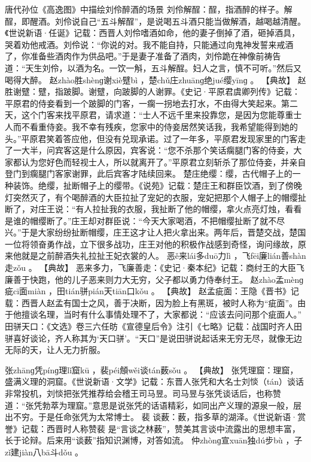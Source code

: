 \documentclass[12pt,UTF8]{ctexbook}
\begin{document}
唐代孙位《高逸图》中描绘刘伶醉酒的场景
刘伶解酲：酲，指酒醉的样子。解酲，即醒酒。刘伶说自己“五斗解酲”，是说喝五斗酒只能当做解酒，越喝越清醒。《世说新语·任诞》记载：西晋人刘伶嗜酒如命，他的妻子倒掉了酒，砸掉酒具，哭着劝他戒酒。刘伶说：“你说的对。我不能自持，只能通过向鬼神发誓来戒酒了，你准备些酒肉作为供品吧。”于是妻子准备了酒肉，刘伶跪在神像前祷告道：“天生刘伶，以酒为名。一饮一斛，五斗解酲。妇人之言，慎不可听。”然后又喝得大醉。
赵zhào胜shènɡ谢xiè躄bì
，楚chǔ庄zhuānɡ绝jué缨yīnɡ
。
【典故】
赵胜谢躄：躄，指跛脚。谢躄，向跛脚的人谢罪。《史记·平原君虞卿列传》记载：平原君的侍妾看到一个跛脚的门客，一瘸一拐地去打水，不由得大笑起来。第二天，这个门客来找平原君，请求道：“士人不远千里来投靠您，是因为您能尊重士人而不看重侍妾。我不幸有残疾，您家中的侍妾居然笑话我，我希望能得到她的头。”平原君笑着答应他，但没有兑现承诺。过了一年多，平原君发现家里的门客走了一大半，问宾客这是什么原因，宾客说：“您不杀那个笑话瘸腿门客的侍妾，大家都认为您好色而轻视士人，所以就离开了。”平原君立刻斩杀了那位侍妾，并亲自登门到瘸腿门客家谢罪，此后宾客才陆续回来。
楚庄绝缨：缨，古代帽子上的一种装饰。绝缨，扯断帽子上的缨带。《说苑》记载：楚庄王和群臣饮酒，到了傍晚灯突然灭了，有个喝醉酒的大臣拉扯了宠妃的衣服，宠妃把那个人帽子上的帽缨扯断了，对庄王说：“有人拉扯我的衣服，我扯断了他的帽缨，拿火点亮灯烛，看看是谁的帽缨断了。”庄王却对群臣说：“今天大家喝酒，不把帽缨扯断了就不尽兴。”于是大家纷纷扯断帽缨，庄王这才让人把火拿出来。两年后，晋楚交战，楚国一位将领奋勇作战，立下很多战功，庄王对他的积极作战感到奇怪，询问缘故，原来他就是之前醉酒失礼拉扯王妃衣裳的人。
恶ě来lái多duō力lì
，飞fēi廉lián善shàn走zǒu
。
【典故】
恶来多力，飞廉善走：《史记·秦本纪》记载：商纣王的大臣飞廉善于快跑，他的儿子恶来则力大无穷，父子都以勇力侍奉纣王。
赵zhào孟mènɡ疵cī面miàn
，田tián骈pián天tiān口kǒu
。
【典故】
赵孟疵面：王隐《晋书》记载：西晋人赵孟有国士之风，善于决断，因为脸上有黑斑，被时人称为“疵面”。由于他擅谈名理，当时有什么事情处理不了，大家都说：“应该去问问那个疵面人。”
田骈天口：《文选》卷三六任昉《宣德皇后令》注引《七略》记载：战国时齐人田骈喜好谈论，齐人称其为‘天口骈’。“天口”是说田骈说起话来无穷无尽，就像无边无际的天，让人无力折服。

张zhānɡ凭pínɡ理lǐ窟kū
，裴péi頠wěi谈tán薮sǒu
。
【典故】
张凭理窟：理窟，盛满义理的洞窟。《世说新语·文学》记载：东晋人张凭和大名士刘惔（tán）谈话非常投机，刘惔把张凭推荐给会稽王司马昱。司马昱与张凭谈话后，也称赞道：“张凭勃萃为理窟。”意思是说张凭的话语精彩，如同出产义理的源泉一般，层出不穷。于是任命张凭为太常博士。
裴
谈薮：薮，指多草的湖泽。《世说新语·赏誉》记载：西晋时人称赞裴
是“言谈之林薮”，赞美其言谈中流露出的思想丰富，长于论辩。后来用“谈薮”指知识渊博，对答如流。
仲zhònɡ宣xuān独dú步bù
，子zǐ建jiàn八bā斗dǒu
。
\end{document}
